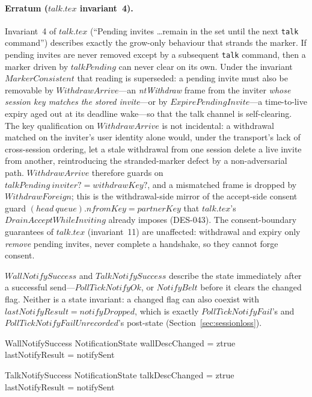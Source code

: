 \documentclass[a4paper,10pt,fleqn]{article}
\begin{document}
\paragraph{Erratum ($talk.tex$ invariant~4).}  Invariant~4 of $talk.tex$
(``Pending invites \ldots remain in the set until the next \texttt{talk}
command'') describes exactly the grow-only behaviour that strands the
marker.  If pending invites are never removed except by a subsequent
\texttt{talk} command, then a marker driven by $talkPending$ can never
clear on its own.  Under the invariant $MarkerConsistent$ that reading is
superseded: a pending invite must also be removable by $WithdrawArrive$---an
\emph{ntWithdraw} frame from the inviter \emph{whose session key matches the
stored invite}---or by $ExpirePendingInvite$---a time-to-live expiry aged out
at its deadline wake---so that the talk channel is self-clearing.  The key
qualification on $WithdrawArrive$ is not incidental: a withdrawal matched on
the inviter's user identity alone would, under the transport's lack of
cross-session ordering, let a stale withdrawal from one session delete a live
invite from another, reintroducing the stranded-marker defect by a
non-adversarial path.  $WithdrawArrive$ therefore guards on
$talkPending~inviter? = withdrawKey?$, and a mismatched frame is dropped by
$WithdrawForeign$; this is the withdrawal-side mirror of the accept-side
consent guard $(head~queue).nfromKey = partnerKey$ that $talk.tex$'s
$DrainAcceptWhileInviting$ already imposes (DES-043).  The consent-boundary
guarantees of $talk.tex$ (invariant~11) are unaffected: withdrawal and expiry
only \emph{remove} pending invites, never complete a handshake, so they cannot
forge consent.

$WallNotifySuccess$ and $TalkNotifySuccess$ describe the state
immediately after a successful send---$PollTickNotifyOk$, or $NotifyBelt$
before it clears the changed flag.  Neither is a state invariant: a
changed flag can also coexist with $lastNotifyResult = notifyDropped$,
which is exactly $PollTickNotifyFail$'s and
$PollTickNotifyFailUnrecorded$'s post-state
(Section~\ref{sec:sessionloss}).

\begin{schema}{WallNotifySuccess}
  NotificationState
  \where
  wallDescChanged = ztrue \\
  lastNotifyResult = notifySent
\end{schema}

\begin{schema}{TalkNotifySuccess}
  NotificationState
  \where
  talkDescChanged = ztrue \\
  lastNotifyResult = notifySent
\end{schema}
\end{document}
